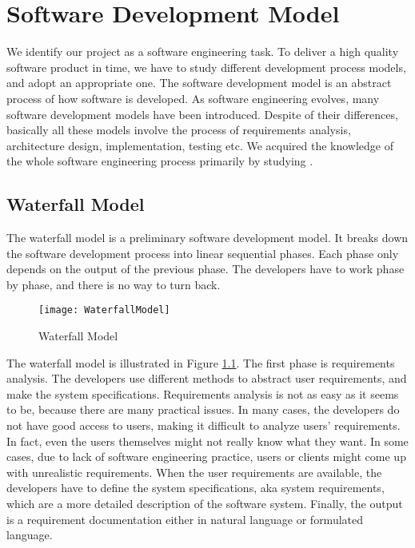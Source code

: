 \chapter{Software Development Model}
We identify our project as a software engineering task. To deliver a high quality software product in time, we have to study different development process models, and adopt an appropriate one. The software development model is an abstract process of how software is developed. As software engineering evolves, many software development models have been introduced. Despite of their differences, basically all these models involve the process of requirements analysis, architecture design, implementation, testing etc. We acquired the knowledge of the whole software engineering process primarily by studying \cite{sommerville2011software}.

\section{Waterfall Model}
The waterfall model is a preliminary software development model. It breaks down the software development process into linear sequential phases. Each phase only depends on the output of the previous phase. The developers have to work phase by phase, and there is no way to turn back.

\begin{figure}[htb]
\centering
\texttt{[image: WaterfallModel]}
\caption{Waterfall Model\label{fig:Waterfall Model}}
\end{figure}

The waterfall model is illustrated in Figure \ref{fig:Waterfall Model}. The first phase is requirements analysis. The developers use different methods to abstract user requirements, and make the system specifications. Requirements analysis is not as easy as it seems to be, because there are many practical issues. In many cases, the developers do not have good access to users, making it difficult to analyze users' requirements. In fact, even the users themselves might not really know what they want. In some cases, due to lack of software engineering practice, users or clients might come up with unrealistic requirements. When the user requirements are available, the developers have to define the system specifications, aka system requirements, which are a more detailed description of the software system. Finally, the output is a requirement documentation either in natural language or formulated language.

